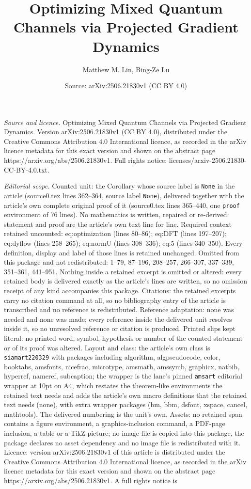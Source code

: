 \documentclass[10pt,a4paper]{amsart}
\title[Optimizing Mixed Quantum Channels via Projected Gradient Dyn]{Optimizing Mixed Quantum Channels via Projected Gradient Dynamics}
\author{Matthew M. Lin, Bing-Ze Lu}
\date{Source: arXiv:2506.21830v1 (CC BY 4.0)}
\begin{document}
\maketitle

\noindent\emph{Source and licence.} Optimizing Mixed Quantum Channels via Projected Gradient Dynamics. Version arXiv:2506.21830v1 (CC BY 4.0), distributed under the Creative Commons Attribution 4.0 International licence, as recorded in the arXiv licence metadata for this exact version and shown on the abstract page https://arxiv.org/abs/2506.21830v1. Full rights notice: licenses/arxiv-2506.21830-CC-BY-4.0.txt.\par\smallskip

\noindent\textit{Editorial scope.} Counted unit: the Corollary whose source label is \texttt{None} in the article (source0.tex lines 362--364, source label \texttt{None}), delivered together with the article's own complete original proof of it (source0.tex lines 365--440, one \texttt{proof} environment of 76 lines). No mathematics is written, repaired or re-derived: statement and proof are the article's own text line for line. Required context retained uncounted: eq:optimization (lines 80--86); eq:DFT (lines 197--207); eq:dyflow (lines 258--265); eq:normU (lines 308--336); eq:5 (lines 340--350). Every definition, display and label of those lines is retained unchanged. Omitted from this package and not redistributed: 1--79, 87--196, 208--257, 266--307, 337--339, 351--361, 441--951. Nothing inside a retained excerpt is omitted or altered: every retained body is delivered exactly as the article's lines are written, so no omission receipt of any kind accompanies this package. Citations: the retained excerpts carry no citation command at all, so no bibliography entry of the article is transcribed and no reference is redistributed. Reference adaptation: none was needed and none was made; every reference inside the delivered unit resolves inside it, so no unresolved reference or citation is produced. Printed slips kept literal: no printed word, symbol, hypothesis or number of the counted statement or of its proof was altered. Layout and class: the article's own class is \texttt{siamart220329} with packages including algorithm, algpseudocode, color, booktabs, amsfonts, nicefrac, microtype, amsmath, amssymb, graphicx, natbib, hyperref, nameref, subcaption; the wrapper is the lane's pinned \texttt{amsart} editorial wrapper at 10pt on A4, which restates the theorem-like environments the retained text needs and adds the article's own macro definitions that the retained text needs (none), with extra wrapper packages (bm, bbm, dsfont, xspace, cancel, mathtools). The delivered numbering is the unit's own. Assets: no retained span contains a figure environment, a graphics-inclusion command, a PDF-page inclusion, a table or a TikZ picture; no image file is copied into this package, the package declares no asset dependency and no image file is redistributed with it. Licence: version arXiv:2506.21830v1 of this article is distributed under the Creative Commons Attribution 4.0 International licence, as recorded in the arXiv licence metadata for this exact version and shown on the abstract page https://arxiv.org/abs/2506.21830v1. A full rights notice is 
\end{document}
